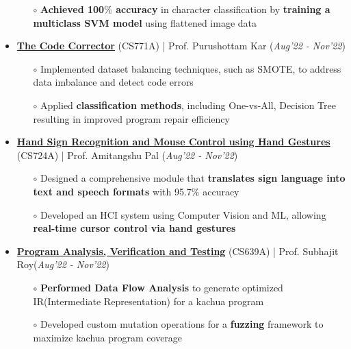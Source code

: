 \documentclass[10.8pt, a4paper]{extarticle}
\begin{document}
\begin{itemize}
\begin{itemize}
    \item[$\circ$] \textbf{Achieved 100$\%$ accuracy} in character classification by \textbf{training a multiclass SVM model} using flattened image data\\[-0.6cm]
  \end{itemize}
  \vspace{0.055cm}
  \item \href{https://github.com/vamshimorlawar/CS771A/tree/main/Assignment_2/} {\textbf{The Code Corrector}} (CS771A) | Prof. Purushottam Kar  \hfill\hfill(\textit{Aug'22 - Nov'22})
  \begin{itemize}
    \item[$\circ$] Implemented dataset balancing techniques, such as SMOTE, to address data imbalance and detect code errors \\[-0.6cm]
    \item[$\circ$] Applied \textbf{classification methods}, including One-vs-All, Decision Tree resulting in improved program repair efficiency \\[-0.6cm]
  \end{itemize}
  \vspace{0.055cm}
  \item \href{https://github.com/Vinay-Agrawal29/Using-Hand-Gestures-CS724} {\textbf{Hand Sign Recognition and Mouse Control using Hand Gestures}} (CS724A) | Prof. Amitangshu Pal  \hfill\hfill(\textit{Aug'22 - Nov'22})
  \begin{itemize}
    \item[$\circ$] Designed a comprehensive module that \textbf{translates sign language into text and speech formats} with 95.7$\%$ accuracy \\[-0.6cm]
    \item[$\circ$] Developed an HCI system using Computer Vision and ML, allowing \textbf{real-time cursor control via hand gestures}\\[-0.6cm]
  \end{itemize}
  \vspace{0.055cm}
  \item \href{https://github.com/vamshimorlawar/CS639A} {\textbf{Program Analysis, Verification and Testing}} (CS639A) | Prof. Subhajit Roy\hfill\hfill(\textit{Aug'22 - Nov'22})
  \begin{itemize}
    \item[$\circ$] \textbf{Performed Data Flow Analysis} to generate optimized IR(Intermediate Representation) for a kachua program \\[-0.6cm]
    \item[$\circ$] Developed custom mutation operations for a \textbf{fuzzing} framework to maximize kachua program coverage \\[-0.6cm]

\end{itemize}
\end{itemize}
\end{document}
